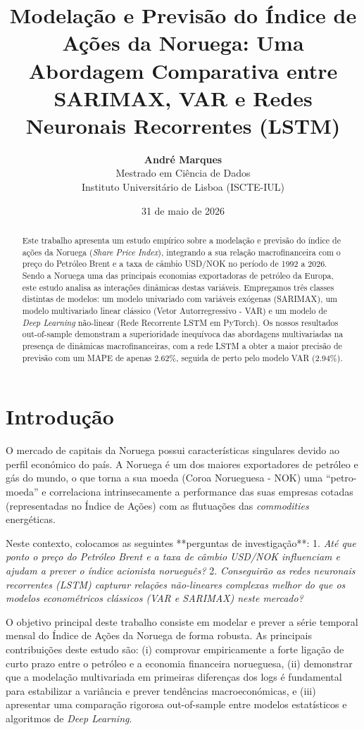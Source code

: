 \documentclass[11pt,a4paper]{article}
\title{\textbf{Modelação e Previsão do Índice de Ações da Noruega: Uma Abordagem Comparativa entre SARIMAX, VAR e Redes Neuronais Recorrentes (LSTM)}}
\author{
  \textbf{André Marques} \\
  Mestrado em Ciência de Dados \\
  Instituto Universitário de Lisboa (ISCTE-IUL)
}
\date{31 de maio de 2026}
\begin{document}
\maketitle

\begin{abstract}
Este trabalho apresenta um estudo empírico sobre a modelação e previsão do índice de ações da Noruega (\textit{Share Price Index}), integrando a sua relação macrofinanceira com o preço do Petróleo Brent e a taxa de câmbio USD/NOK no período de 1992 a 2026. Sendo a Noruega uma das principais economias exportadoras de petróleo da Europa, este estudo analisa as interações dinâmicas destas variáveis. Empregamos três classes distintas de modelos: um modelo univariado com variáveis exógenas (SARIMAX), um modelo multivariado linear clássico (Vetor Autorregressivo - VAR) e um modelo de \textit{Deep Learning} não-linear (Rede Recorrente LSTM em PyTorch). Os nossos resultados out-of-sample demonstram a superioridade inequívoca das abordagens multivariadas na presença de dinâmicas macrofinanceiras, com a rede LSTM a obter a maior precisão de previsão com um MAPE de apenas 2.62\%, seguida de perto pelo modelo VAR (2.94\%).
\end{abstract}

\section{Introdução}
O mercado de capitais da Noruega possui características singulares devido ao perfil económico do país. A Noruega é um dos maiores exportadores de petróleo e gás do mundo, o que torna a sua moeda (Coroa Norueguesa - NOK) uma ``petro-moeda'' e correlaciona intrinsecamente a performance das suas empresas cotadas (representadas no Índice de Ações) com as flutuações das \textit{commodities} energéticas. 

Neste contexto, colocamos as seguintes **perguntas de investigação**:
1. \textit{Até que ponto o preço do Petróleo Brent e a taxa de câmbio USD/NOK influenciam e ajudam a prever o índice acionista norueguês?}
2. \textit{Conseguirão as redes neuronais recorrentes (LSTM) capturar relações não-lineares complexas melhor do que os modelos econométricos clássicos (VAR e SARIMAX) neste mercado?}

O objetivo principal deste trabalho consiste em modelar e prever a série temporal mensal do Índice de Ações da Noruega de forma robusta. As principais contribuições deste estudo são: (i) comprovar empiricamente a forte ligação de curto prazo entre o petróleo e a economia financeira norueguesa, (ii) demonstrar que a modelação multivariada em primeiras diferenças dos logs é fundamental para estabilizar a variância e prever tendências macroeconómicas, e (iii) apresentar uma comparação rigorosa out-of-sample entre modelos estatísticos e algoritmos de \textit{Deep Learning}.
\end{document}
